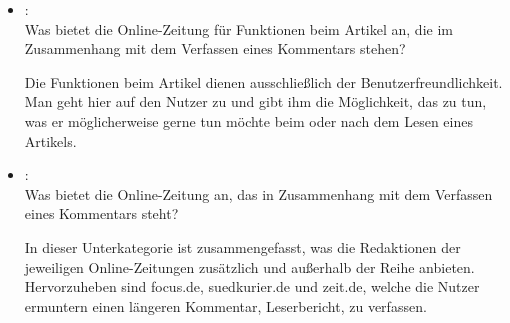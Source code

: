 \begin{itemize}[noitemsep]
  \item{}\grqq:\\
    Was bietet die Online-Zeitung für Funktionen beim Artikel an, die im
    Zusammenhang mit dem Verfassen eines Kommentars stehen?
    
    Die \glqq Funktionen beim Artikel\grqq\- dienen ausschließlich der Benutzerfreundlichkeit. 
 Man geht hier auf den Nutzer zu und gibt ihm die Möglichkeit, das zu tun, was er 
 möglicherweise gerne tun möchte beim oder nach dem Lesen eines Artikels.

  \item{}\grqq:\\
    Was bietet die Online-Zeitung an, das in Zusammenhang mit dem Verfassen
    eines Kommentars steht?
    
    In dieser Unterkategorie ist zusammengefasst, was die Redaktionen der 
    jeweiligen Online-Zeitungen zusätzlich und außerhalb der Reihe anbieten. 
    Hervorzuheben sind focus.de, suedkurier.de und zeit.de, welche  die Nutzer ermuntern einen 
    längeren Kommentar, Leserbericht, zu verfassen. 
 
 
 
    
\end{itemize}


